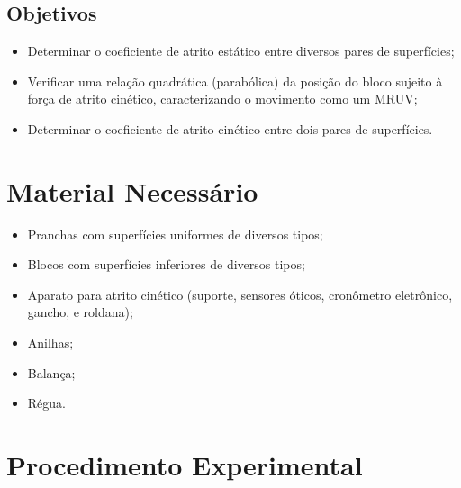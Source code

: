 \pagebreak
\subsection{Objetivos}

\begin{itemize}
	\item Determinar o coeficiente de atrito estático entre diversos pares de superfícies;
	\item Verificar uma relação quadrática (parabólica) da posição do bloco sujeito à força de atrito cinético, caracterizando o movimento como um MRUV;
	\item Determinar o coeficiente de atrito cinético entre dois pares de superfícies.
\end{itemize}

\section{Material Necessário}

\begin{itemize}
	\item Pranchas com superfícies uniformes de diversos tipos;
	\item Blocos com superfícies inferiores de diversos tipos;
	\item Aparato para atrito cinético (suporte, sensores óticos, cronômetro eletrônico, gancho, e roldana);
	\item Anilhas;
	\item Balança;
	\item Régua.
\end{itemize}

\section{Procedimento Experimental}

